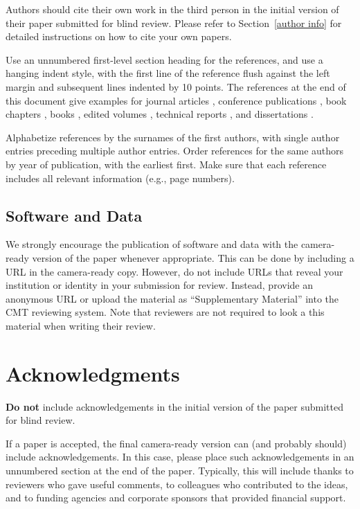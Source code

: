\documentclass{article}
\begin{document}
Authors should cite their own work in the third person
in the initial version of their paper submitted for blind review.
Please refer to Section~\ref{author info} for detailed instructions on how to
cite your own papers.

Use an unnumbered first-level section heading for the references, and
use a hanging indent style, with the first line of the reference flush
against the left margin and subsequent lines indented by 10 points.
The references at the end of this document give examples for journal
articles \cite{Samuel59}, conference publications \cite{langley00}, book chapters \cite{Newell81}, books \cite{DudaHart2nd}, edited volumes \cite{MachineLearningI},
technical reports \cite{mitchell80}, and dissertations \cite{kearns89}.

Alphabetize references by the surnames of the first authors, with
single author entries preceding multiple author entries. Order
references for the same authors by year of publication, with the
earliest first. Make sure that each reference includes all relevant
information (e.g., page numbers).

\subsection{Software and Data}

We strongly encourage the publication of software and data with the
camera-ready version of the paper whenever appropriate.  This can be
done by including a URL in the camera-ready copy.  However, do not
include URLs that reveal your institution or identity in your
submission for review.  Instead, provide an anonymous URL or upload
the material as ``Supplementary Material'' into the CMT reviewing
system.  Note that reviewers are not required to look a this material
when writing their review.


\section*{Acknowledgments}

\textbf{Do not} include acknowledgements in the initial version of
the paper submitted for blind review.

If a paper is accepted, the final camera-ready version can (and
probably should) include acknowledgements. In this case, please
place such acknowledgements in an unnumbered section at the
end of the paper. Typically, this will include thanks to reviewers
who gave useful comments, to colleagues who contributed to the ideas,
and to funding agencies and corporate sponsors that provided financial
support.


\nocite{langley00}



\end{document}
